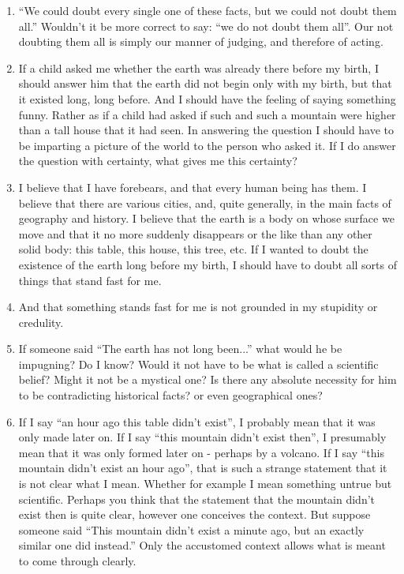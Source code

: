\documentclass{book}
\begin{document}
\begin{enumerate}
\item
``We could doubt every single one of these facts, but we could not doubt them
all.'' Wouldn't it be more correct to say: ``we do not doubt them all''.  Our
not doubting them all is simply our manner of judging, and therefore of acting.

\item
If a child asked me whether the earth was already there before my birth, I
should answer him that the earth did not begin only with my birth, but that it
existed long, long before. And I should have the feeling of saying something
funny. Rather as if a child had asked if such and such a mountain were higher
than a tall house that it had seen. In answering the question I should have to
be imparting a picture of the world to the person who asked it.  If I do answer
the question with certainty, what gives me this certainty?

\item
I believe that I have forebears, and that every human being has them. I believe
that there are various cities, and, quite generally, in the main facts of
geography and history. I believe that the earth is a body on whose surface we
move and that it no more suddenly disappears or the like than any other solid
body: this table, this house, this tree, etc. If I wanted to doubt the
existence of the earth long before my birth, I should have to doubt all sorts
of things that stand fast for me.

\item
And that something stands fast for me is not grounded in my stupidity or
credulity.

\item
If someone said ``The earth has not long been...'' what would he be impugning?
Do I know?  Would it not have to be what is called a scientific belief? Might
it not be a mystical one? Is there any absolute necessity for him to be
contradicting historical facts? or even geographical ones?

\item
If I say ``an hour ago this table didn't exist'', I probably mean that it was
only made later on.  If I say ``this mountain didn't exist then'', I presumably
mean that it was only formed later on - perhaps by a volcano.  If I say ``this
mountain didn't exist an hour ago'', that is such a strange statement that it
is not clear what I mean. Whether for example I mean something untrue but
scientific. Perhaps you think that the statement that the mountain didn't exist
then is quite clear, however one conceives the context. But suppose someone
said ``This mountain didn't exist a minute ago, but an exactly similar one did
instead.'' Only the accustomed context allows what is meant to come through
clearly.


\end{enumerate}
\end{document}
